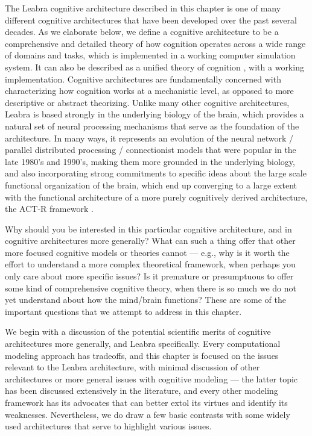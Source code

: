 \documentclass[11pt,twoside]{article}
\begin{document}
The Leabra cognitive architecture described in this chapter is one of many different cognitive architectures that have been developed over the past several decades.  As we elaborate below, we define a cognitive architecture to be a comprehensive and detailed theory of how cognition operates across a wide range of domains and tasks, which is implemented in a working computer simulation system.  It can also be described as a unified theory of cognition \cite{Newell90}, with a working implementation.  Cognitive architectures are fundamentally concerned with characterizing how cognition works at a mechanistic level, as opposed to more descriptive or abstract theorizing.  Unlike many other cognitive architectures, Leabra is based strongly in the underlying biology of the brain, which provides a natural set of neural processing mechanisms that serve as the foundation of the architecture.  In many ways, it represents an evolution of the neural network / parallel distributed processing / connectionist models that were popular in the late 1980's and 1990's, making them more grounded in the underlying biology, and also incorporating strong commitments to specific ideas about the large scale functional organization of the brain, which end up converging to a large extent with the functional architecture of a more purely cognitively derived architecture, the ACT-R framework \cite{AndersonRefs}.

Why should you be interested in this particular cognitive architecture, and in cognitive architectures more generally?  What can such a thing offer that other more focused cognitive models or theories cannot --- e.g., why is it worth the effort to understand a more complex theoretical framework, when perhaps you only care about more specific issues?  Is it premature or presumptuous to offer some kind of comprehensive cognitive theory, when there is so much we do not yet understand about how the mind/brain functions?  These are some of the important questions that we attempt to address in this chapter.

We begin with a discussion of the potential scientific merits of cognitive architectures more generally, and Leabra specifically.  Every computational modeling approach has tradeoffs, and this chapter is focused on the issues relevant to the Leabra architecture, with minimal discussion of other architectures or more general issues with cognitive modeling --- the latter topic has been discussed extensively in the literature, and every other modeling framework has its advocates that can better extol its virtues and identify its weaknesses.  Nevertheless, we do draw a few basic contrasts with some widely used architectures that serve to highlight various issues.
\end{document}
